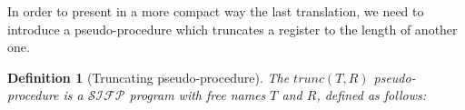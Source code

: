 \documentclass[10pt]{amsart}
\newcommand{\SIFP}{\mathcal{SIFP}}
\newcommand{\zero}{\mathtt{0}}
\newcommand{\one}{\mathtt{1}}
\newcommand{\while}[2]{\mathbf{while}(#1)\{#2\}}
\newcommand{\takes}{\leftarrow}
\newtheorem{defn}{Definition}
\begin{document}
In order to present in a more compact way the last translation, we need to introduce a pseudo-procedure which truncates a register to the length of another one.

\begin{defn}[Truncating pseudo-procedure]
The $trunc(T, R)$ pseudo-procedure is a $\SIFP$ program with free names $T$ and $R$, defined as follows:

\begin{comment}
\begin{align*}
trunc(T, R) \coloneqq &Q \takes R;\\
                      &R \takes \epsilon;\\
                      &Z \takes \epsilon;\\
                      &\while {Z \sqsubset T} {\\
                      &\quad B \takes \one;\\
                      &\quad \while {Z.\zero \sqsubseteq T \land B} {\\
                      &\quad \quad B \takes \one;\\
                      &\quad \quad \while {R.\zero \sqsubseteq Q \land B} {\\
                      &\quad \quad \quad R \takes R.\zero;\\
                      &\quad \quad \quad B \takes \zero;\\
                      &\quad \quad \quad }\\
                      &\quad \quad \while {R.\one \sqsubseteq Q \land B} {\\
                      &\quad \quad \quad R \takes R.\one;\\
                      &\quad \quad \quad B \takes \zero;\\
                      &\quad \quad \quad }\\
                      &\quad \quad Z \takes Z.0;\\
                      &\quad \quad B \takes 0;\\
                      &\quad \quad }\\
                      &\quad \while {Z.\one \sqsubseteq T \land B} {\\
                      &\quad \quad B \takes \one;\\
                      &\quad \quad \while {R.\zero \sqsubseteq Q \land B} {\\
                      &\quad \quad \quad R \takes R.\zero;\\

\end{comment}
\end{defn}
\end{document}
